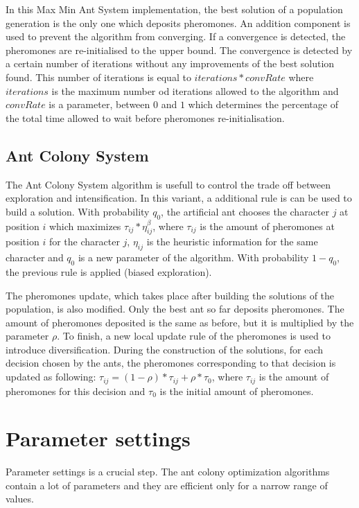\documentclass{article}
\begin{document}
In this Max Min Ant System implementation, the best solution of a population generation is the only one which deposits pheromones.
An addition component is used to prevent the algorithm from converging.
If a convergence is detected, the pheromones are re-initialised to the upper bound.
The convergence is detected by a certain number of iterations without any improvements of the best solution found.
This number of iterations is equal to $iterations*convRate$ where $iterations$ is the maximum number od iterations allowed to the algorithm and $convRate$ is a parameter, between $0$ and $1$ which determines the percentage of the total time allowed to wait before pheromones re-initialisation.

\subsection{Ant Colony System}

The Ant Colony System algorithm is usefull to control the trade off between exploration and intensification.
In this variant, a additional rule is can be used to build a solution.
With probability $q_0$, the artificial ant chooses the character $j$ at position $i$ which maximizes $\tau_{ij}*\eta_{ij}^{\beta}$, where $\tau_{ij}$ is the amount of pheromones at position $i$ for the character $j$, $\eta_{ij}$ is the heuristic information for the same character and $q_0$ is a new parameter of the algorithm.
With probability $1-q_0$, the previous rule is applied (biased exploration).\newline

The pheromones update, which takes place after building the solutions of the population, is also modified.
Only the best ant so far deposits pheromones.
The amount of pheromones deposited is the same as before, but it is multiplied by the parameter $\rho$.
To finish, a new local update rule of the pheromones is used to introduce diversification.
During the construction of the solutions, for each decision chosen by the ants, the pheromones corresponding to that decision is updated as following: $\tau_{ij}=(1-\rho)*\tau_{ij}+\rho*\tau_0$, where $\tau_{ij}$ is the amount of pheromones for this decision and $\tau_0$ is the initial amount of pheromones.

\section{Parameter settings}

Parameter settings is a crucial step.
The ant colony optimization algorithms contain a lot of parameters and they are efficient only for a narrow range of values. \newline
\end{document}
